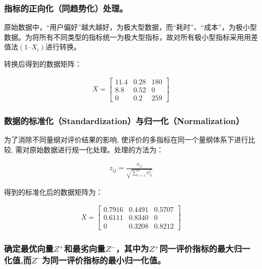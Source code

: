 \documentclass[
  journal=,
  manuscript=,
  year=2022,
  volume=01,
]{cup-journal}
\begin{document}
\subsubsection{指标的正向化（同趋势化）处理。}

\par 原始数据中，“用户偏好”越大越好，为极大型数据，而“耗时”、“成本”，为极小型数据。为将所有不同类型的指标统一为极大型指标，故对所有极小型指标采用用差值法$(1–X_{i})$进行转换。
\par 转换后得到的数据矩阵：

\begin{equation}
	\begin{aligned}
		X=
		\begin{bmatrix}
			11.4 & 0.28 & 180 \\
			8.8 & 0.52 & 0 \\
			0 & 0.2 & 259
		\end{bmatrix}
	\end{aligned}
\end{equation}

\subsubsection{数据的标准化（Standardization）与归一化（Normalization）}

\par 为了消除不同量纲对评价结果的影响, 使评价的多指标在同一个量纲体系下进行比较, 需对原始数据进行规一化处理。处理的方法为：

\begin{equation}
	\begin{aligned}
		z_{ij}=\frac{x_{ij}}{\sqrt{\sum_{i=1}^{n} x_{ij}^{2} } }
	\end{aligned}
\end{equation}

\par 得到的标准化后的数据矩阵为：

\begin{equation}
	\begin{aligned}
		X=
		\begin{bmatrix}
			0.7916 & 0.4491 & 0.5707 \\
			0.6111 & 0.8340 & 0 \\
			0 & 0.3208 & 0.8212
		\end{bmatrix}
	\end{aligned}
\end{equation}

\subsubsection{确定最优向量$Z^{+}$和最劣向量$Z^{-}$，其中为$Z^{+}$同一评价指标的最大归一化值,而$Z^{-}$为同一评价指标的最小归一化值。}
\end{document}
